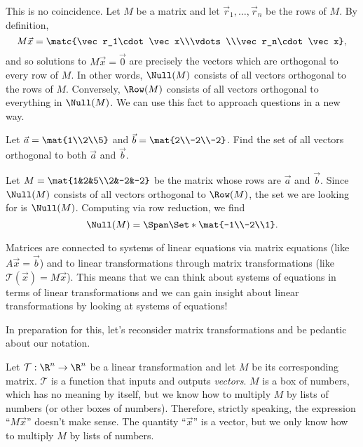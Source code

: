 This is no coincidence. Let $M$ be a matrix and let $\vec r_1,\ldots,\vec r_n$ be the rows of $M$. By definition,
\[
	M\vec x=\matc{\vec r_1\cdot \vec x\\\vdots\\\vec r_n\cdot \vec x},
\]
and so solutions to $M\vec x=\vec 0$ are precisely the vectors which are orthogonal to every row of $M$. In other words,
$\Null(M)$ consists of all vectors orthogonal to the rows of $M$.
Conversely, $\Row(M)$ consists of all vectors orthogonal to everything in $\Null(M)$. We can use this
fact to approach questions in a new way.

\begin{example}
	Let $\vec a=\mat{1\\2\\5}$ and $\vec b=\mat{2\\-2\\-2}$. Find the set of all vectors orthogonal
	to both $\vec a$ and $\vec b$.

	Let $M=\mat{1&2&5\\2&-2&-2}$ be the matrix whose rows are $\vec a$ and $\vec b$. Since
	$\Null(M)$ consists of all vectors orthogonal to $\Row(M)$, the set we are looking for is
	$\Null(M)$. Computing via row reduction, we find
	\[
		\Null(M)=\Span\Set*{\mat{-1\\-2\\1}}.
	\]
\end{example}




Matrices are connected to systems of linear equations via matrix equations (like $A\vec x=\vec b$)
and to linear transformations through matrix transformations (like $\mathcal T(\vec x)=M\vec x$).
This means that we can think about systems of equations in terms of linear transformations and
we can gain insight about linear transformations by looking at systems of equations!

In preparation for this, let's reconsider matrix transformations and be pedantic about our notation.

Let $\mathcal T:\R^n\to\R^n$ be a linear transformation and let $M$ be its corresponding matrix.
$\mathcal T$ is a function that inputs and outputs \emph{vectors}. $M$ is a box of numbers,
which has no meaning by itself, but we know how to multiply $M$ by lists of numbers (or other boxes of numbers).
Therefore, strictly speaking, the expression ``$M\vec x$'' doesn't make sense. The quantity ``$\vec x$'' is a
vector, but we only know how to multiply $M$ by lists of numbers.

